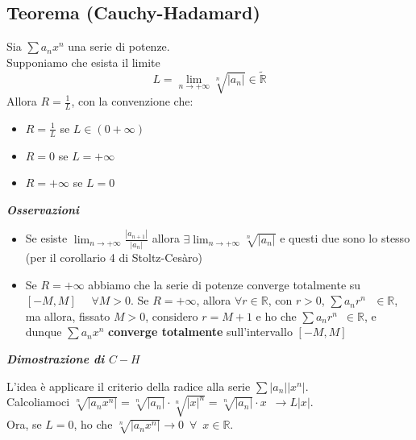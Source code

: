 \documentclass{article}
\theoremstyle{definition}
\newcommand{\R}{\mathbb{R}}
\begin{document}
\subsection{Teorema (Cauchy-Hadamard)}
Sia $\sum a_nx^n$ una serie di potenze.
\\
Supponiamo che esista il limite 
\begin{equation}
    L=\lim_{n \to +\infty}\sqrt[n]{|a_n|} \in \tilde{\R}
\end{equation}
Allora $R=\frac{1}{L}$, con la convenzione che:
\begin{itemize}
    \item $R=\frac{1}{L}$ se $L \in (0+\infty)$
    \item $R=0$ se $L = +\infty$
    \item $R=+\infty$ se $L=0$
\end{itemize}
\begin{center}
    \textbf{\textit{Osservazioni}}
\end{center}
\begin{itemize}
\item Se esiste $\lim_{n \to +\infty}\frac{|a_{n+1}|}{|a_n|}$ allora $\exists \lim_{n \to +\infty} \sqrt[n]{|a_n|}$ e questi due sono lo stesso (per il corollario 4 di Stoltz-Cesàro)
\item Se $R=+\infty$ abbiamo che la serie di potenze converge totalmente su $\left[-M,M\right]$ \,\,\,\, $\forall M > 0$.
Se $R=+\infty$, allora $\forall r \in \R$, con $r > 0$, $\sum a_nr^n \,\,\,\, \in \R$, ma allora, fissato $M>0$, considero $r=M+1$ e ho che $\sum a_nr^n \,\,\, \in \R$, e dunque $\sum a_nx^n$ \textbf{converge totalmente} sull'intervallo $[-M,M]$
\end{itemize}
\begin{center}
    \textbf{\textit{Dimostrazione di $C-H$}}
\end{center}
L'idea è applicare il criterio della radice alla serie $\sum |a_n||x^n|$.
\\
Calcoliamoci $\sqrt[n]{|a_nx^n|}=\sqrt[n]{|a_n|} \cdot \sqrt[n]{|x|^n}=\sqrt[n]{|a_n|}\cdot x \,\,\, \to L|x|$.
\\
Ora, se $L=0$, ho che $\sqrt[n]{|a_nx^n|} \to 0 \,\,\, \forall \,\,\, x \in \R$.
\end{document}
